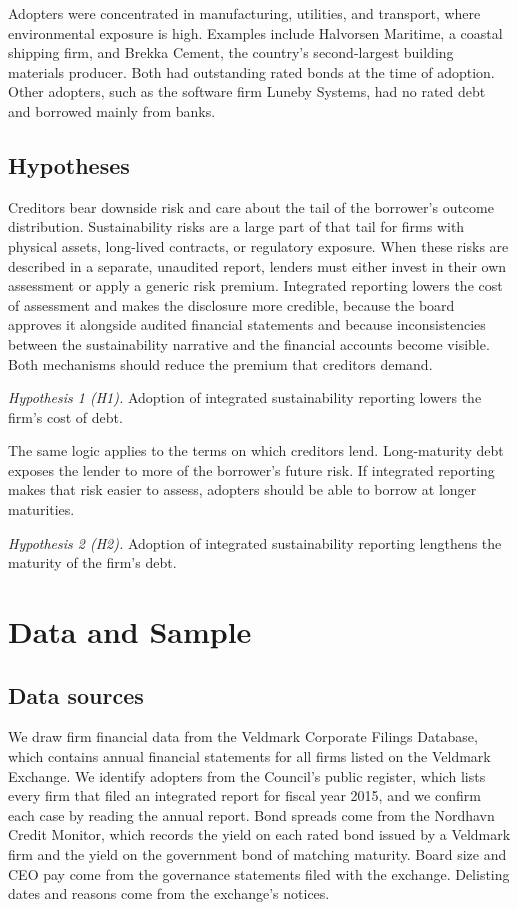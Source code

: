 \documentclass[11pt]{article}
\begin{document}
Adopters were concentrated in manufacturing, utilities, and transport, where environmental exposure is high. Examples include Halvorsen Maritime, a coastal shipping firm, and Brekka Cement, the country's second-largest building materials producer. Both had outstanding rated bonds at the time of adoption. Other adopters, such as the software firm Luneby Systems, had no rated debt and borrowed mainly from banks.

\subsection{Hypotheses}

Creditors bear downside risk and care about the tail of the borrower's outcome distribution. Sustainability risks are a large part of that tail for firms with physical assets, long-lived contracts, or regulatory exposure. When these risks are described in a separate, unaudited report, lenders must either invest in their own assessment or apply a generic risk premium. Integrated reporting lowers the cost of assessment and makes the disclosure more credible, because the board approves it alongside audited financial statements and because inconsistencies between the sustainability narrative and the financial accounts become visible. Both mechanisms should reduce the premium that creditors demand.

\medskip
\noindent\textit{Hypothesis 1 (H1).} Adoption of integrated sustainability reporting lowers the firm's cost of debt.
\medskip

The same logic applies to the terms on which creditors lend. Long-maturity debt exposes the lender to more of the borrower's future risk. If integrated reporting makes that risk easier to assess, adopters should be able to borrow at longer maturities.

\medskip
\noindent\textit{Hypothesis 2 (H2).} Adoption of integrated sustainability reporting lengthens the maturity of the firm's debt.
\medskip

\section{Data and Sample}

\subsection{Data sources}

We draw firm financial data from the Veldmark Corporate Filings Database, which contains annual financial statements for all firms listed on the Veldmark Exchange. We identify adopters from the Council's public register, which lists every firm that filed an integrated report for fiscal year 2015, and we confirm each case by reading the annual report. Bond spreads come from the Nordhavn Credit Monitor, which records the yield on each rated bond issued by a Veldmark firm and the yield on the government bond of matching maturity. Board size and CEO pay come from the governance statements filed with the exchange. Delisting dates and reasons come from the exchange's notices.
\end{document}
